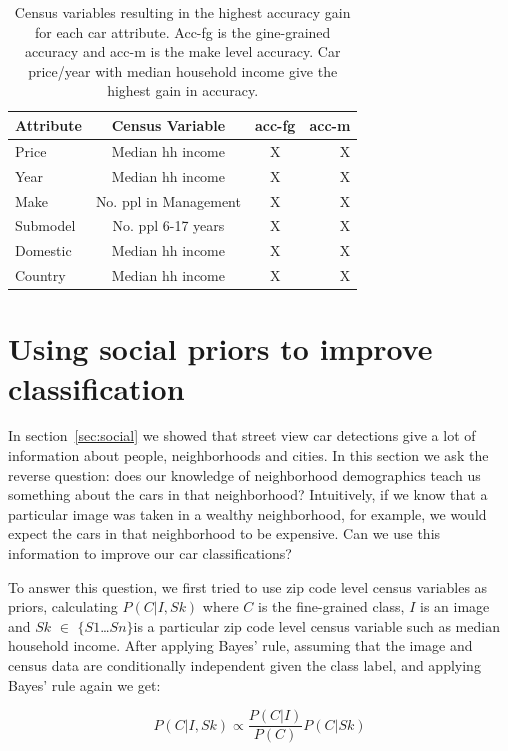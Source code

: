 \documentclass[10pt,twocolumn,letterpaper]{article}
\begin{document}
\begin{table}
\begin{center}
\begin{tabular}{|l|c|c|r|}
\hline
\textbf{Attribute} & \textbf{Census Variable}& \textbf{acc-fg} &\textbf{acc-m}\\
\hline\hline
Price & Median hh income & X & X\\
Year  & Median hh income & X & X\\
Make & No. ppl in Management & X &X \\
Submodel & No. ppl 6-17 years & X & X \\
Domestic & Median hh income & X & X\\
Country & Median hh income & X & X\\
\hline
\end{tabular}
\end{center}
\caption{Census variables resulting in the highest accuracy gain for each car attribute. Acc-fg is the gine-grained accuracy and acc-m is the make level accuracy. Car price/year with median household income give the highest gain in accuracy.}
\label{table:prior-acc}
\end{table}

\section{Using social priors to improve classification}
In section~\ref{sec:social} we showed that street view car detections give a lot of information about people, neighborhoods and cities. In this section we ask the reverse question: does our knowledge of neighborhood demographics teach us something about the cars in that neighborhood? Intuitively, if we know that a particular image was taken in a wealthy neighborhood, for example, we would expect the cars in that neighborhood to be expensive. Can we use this information to improve our car classifications?

To answer this question, we first tried to use zip code level census variables as priors, calculating \(P(C|I,Sk)\) where \(C\) is the fine-grained class, \(I\) is an image and \(Sk\) \(\in\) \(\{\)\(S1\)\ldots \(Sn\)\(\}\)is a particular zip code level census variable such as median household income. After applying Bayes' rule, assuming that the image and census data are conditionally independent given the class label, and applying Bayes' rule again we get:

\begin{equation}
P(C|I,Sk)\propto \frac{P(C|I)}{P(C)}P(C|Sk)
\label{eq:prior-eq}
\end{equation}
\end{document}
